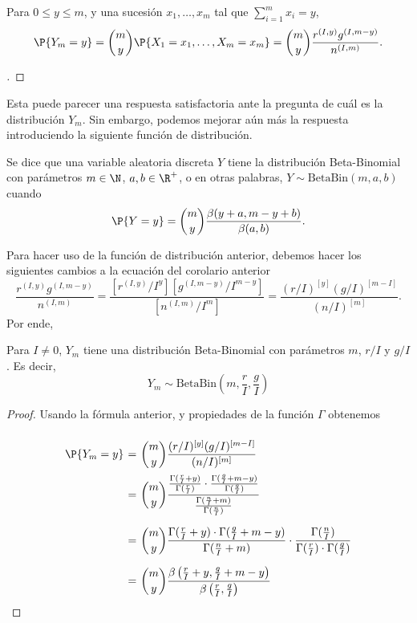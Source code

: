 \begin{corollary}\label{polya-mass-Y}
    Para $0\leq y \leq m$, y una sucesión $x_1,\ldots,x_m$ tal que $\sum_{i = 1}^m x_i = y$,
    \[ \P\{Y_m = y\} = \binom{m}{y} \P\{X_1 = x_1,\ldots, X_m = x_m\} = \binom{m}{y}\frac{r^{(I,y)} g^{(I,m-y)}}{n^{(I,m)}}.\]
\end{corollary}
\begin{proof}[]
    \vspace*{-2em}
\end{proof}

Esta puede parecer una respuesta satisfactoria ante la pregunta de cuál es la distribución $Y_m$. Sin embargo, podemos mejorar aún más la respuesta introduciendo la siguiente función de distribución.

\begin{definition} Se dice que una variable aleatoria discreta $Y$ tiene la distribución Beta-Binomial con parámetros $m\in \N$, $a,b\in \R^+$, o en otras palabras, $Y\sim\text{BetaBin}(m,a,b)$ cuando
    \[ \P\{Y = y\} = \binom{m}{y}\frac{\beta(y+a,m-y+b)}{\beta(a,b)}. \]    
\end{definition}

Para hacer uso de la función de distribución anterior, debemos hacer los siguientes cambios a la ecuación del corolario anterior
\[ \frac{r^{(I,y)} g^{(I,m-y)}}{n^{(I,m)}} = \frac{[r^{(I,y)}/I^y] [g^{(I,m-y)}/I^{m-y}]}{[n^{(I,m)}/I^m]} = \frac{(r/I)^{[y]}(g/I)^{[m-I]}}{(n/I)^{[m]}}. \]
Por ende,

\begin{theorem}\label{Y-distribution}
    Para $I \neq 0$, $Y_m$ tiene una distribución Beta-Binomial con parámetros $m$, $r/I$ y $g/I$. Es decir,
    \[ Y_m\sim \text{BetaBin}\left( m, \frac{r}{I}, \frac{g}{I} \right) \]
\end{theorem}

\begin{proof} Usando la fórmula anterior, y propiedades de la función $\Gamma$ obtenemos
    \[ \everymath{\displaystyle}
    \arraycolsep=1.8pt\def\arraystretch{3}
    \begin{array}{rcl}
        \P\{Y_m = y\} & = & \binom{m}{y} \frac{(r/I)^{[y]}(g/I)^{[m-I]}}{(n/I)^{[m]}} \\
        & = & \binom{m}{y} \frac{\frac{\Gamma(\frac{r}{I}+y)}{\Gamma(\frac{r}{I})} \cdot \frac{\Gamma(\frac{g}{I}+m-y)}{\Gamma(\frac{g}{I})}}{\frac{\Gamma(\frac{n}{I}+m)}{\Gamma(\frac{n}{I})}} \\
        & = & \binom{m}{y} \frac{\Gamma(\frac{r}{I}+y) \cdot \Gamma(\frac{g}{I}+m-y)}{\Gamma(\frac{n}{I}+m)} \cdot \frac{\Gamma(\frac{n}{I})}{\Gamma(\frac{r}{I}) \cdot \Gamma(\frac{g}{I})} \\
        & = & \binom{m}{y} \frac{\beta\left( \frac{r}{I} + y, \frac{g}{I} + m - y \right)}{\beta\left( \frac{r}{I}, \frac{g}{I} \right)} 
    \end{array}\]
\end{proof}



